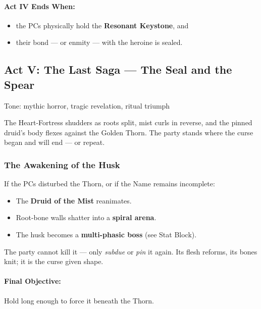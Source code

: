 \documentclass[11pt]{article}
\begin{document}
\paragraph{Act IV Ends When:}

\begin{itemize}
  \item the PCs physically hold the \textbf{Resonant Keystone}, and
  \item their bond --- or enmity --- with the heroine is sealed.
\end{itemize}

\subsection*{Act V: The Last Saga --- The Seal and the Spear}
\label{act5:last_saga}

Tone: mythic horror, tragic revelation, ritual triumph

\noindent
The Heart-Fortress shudders as roots split, mist curls in reverse,  
and the pinned druid's body flexes against the Golden Thorn.  
The party stands where the curse began and will end --- or repeat.

\subsubsection*{The Awakening of the Husk}

If the PCs disturbed the Thorn, or if the Name remains incomplete:

\begin{itemize}
  \item The \textbf{Druid of the Mist} reanimates.
  \item Root-bone walls shatter into a \textbf{spiral arena}.
  \item The husk becomes a \textbf{multi-phasic boss} (see Stat Block).
\end{itemize}

The party cannot kill it --- only \emph{subdue} or \emph{pin} it again.  
Its flesh reforms, its bones knit; it is the curse given shape.

\paragraph*{Final Objective:}  
Hold long enough to force it beneath the Thorn.
\end{document}
